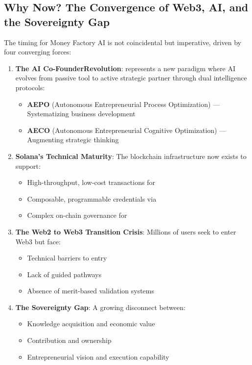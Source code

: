 \subsection{Why Now? The Convergence of Web3, AI, and the Sovereignty Gap}

The timing for Money Factory AI is not coincidental but imperative, driven by four converging forces:

\begin{enumerate}
    \item \textbf{The AI Co-Founder\texttrademark Revolution}:  represents a new paradigm where AI evolves from passive tool to active strategic partner through dual intelligence protocols:
    
    \begin{itemize}
        \item \textbf{AEPO} (Autonomous Entrepreneurial Process Optimization) — Systematizing business development
        \item \textbf{AECO} (Autonomous Entrepreneurial Cognitive Optimization) — Augmenting strategic thinking
    \end{itemize}
    
    \item \textbf{Solana's Technical Maturity}: The blockchain infrastructure now exists to support:
    
    \begin{itemize}
        \item High-throughput, low-cost transactions for 
        \item Composable, programmable credentials via 
        \item Complex on-chain governance for 
    \end{itemize}
    
    \item \textbf{The Web2 to Web3 Transition Crisis}: Millions of users seek to enter Web3 but face:
    
    \begin{itemize}
        \item Technical barriers to entry
        \item Lack of guided pathways
        \item Absence of merit-based validation systems
    \end{itemize}
    
    \item \textbf{The Sovereignty Gap}: A growing disconnect between:
    
    \begin{itemize}
        \item Knowledge acquisition and economic value
        \item Contribution and ownership
        \item Entrepreneurial vision and execution capability
    \end{itemize}
\end{enumerate}

